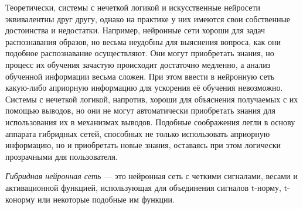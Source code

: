 Теоретически, системы с нечеткой логикой и искусственные нейросети эквивалентны
друг другу, однако на практике у них имеются свои собственные достоинства и недостатки.
Например, нейронные сети хороши для задач распознавания образов, но весьма неудобны
для выяснения вопроса, как они подобное распознавание осуществляют.
Они могут приобретать знания, но процесс их обучения зачастую происходит достаточно
медленно, а анализ обученной информации весьма сложен.
При этом ввести в нейронную сеть какую-либо априорную информацию для ускорения
её обучения невозможно.
Системы с нечеткой логикой, напротив, хороши для объяснения получаемых с их
помощью выводов, но они не могут автоматически приобретать знания для использования
их в механизмах выводов.
Подобные соображения легли в основу аппарата гибридных сетей,
способных не только использовать априорную информацию,
но и приобретать новые знания, оставаясь при этом логически прозрачными для пользователя.

\emph{Гибридная нейронная сеть} --- это нейронная сеть с четкими сигналами,
весами и активационной функцией, использующая для объединения сигналов
t-норму, t-конорму или некоторые подобные им функции.

